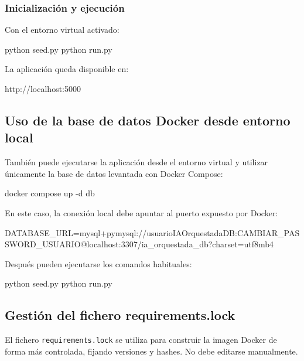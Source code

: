 \subsubsection{Inicialización y ejecución}

Con el entorno virtual activado:

\begin{bloqueTerminal}[title={Inicialización y ejecución local}]
	python seed.py
	python run.py
\end{bloqueTerminal}

La aplicación queda disponible en:

\begin{bloqueCodigo}[title={URL local de acceso}]
	http://localhost:5000
\end{bloqueCodigo}

\subsection{Uso de la base de datos Docker desde entorno local}

También puede ejecutarse la aplicación desde el entorno virtual y utilizar únicamente la base de datos levantada con Docker Compose:

\begin{bloqueTerminal}[title={Arranque solo de MariaDB mediante Docker}]
	docker compose up -d db
\end{bloqueTerminal}

En este caso, la conexión local debe apuntar al puerto expuesto por Docker:

\begin{bloqueCodigo}[title={DATABASE\_URL usando MariaDB en Docker}]
	DATABASE_URL=mysql+pymysql://usuarioIAOrquestadaDB:CAMBIAR_PASSWORD_USUARIO@localhost:3307/ia_orquestada_db?charset=utf8mb4
\end{bloqueCodigo}

Después pueden ejecutarse los comandos habituales:

\begin{bloqueTerminal}[title={Ejecución local usando base de datos Docker}]
	python seed.py
	python run.py
\end{bloqueTerminal}

\subsection{Gestión del fichero requirements.lock}

El fichero \texttt{requirements.lock} se utiliza para construir la imagen Docker de forma más controlada, fijando versiones y hashes. No debe editarse manualmente.

